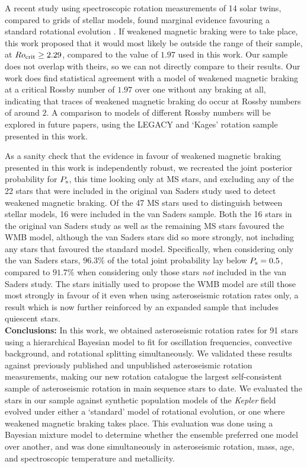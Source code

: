 \documentclass[12pt]{article}
\begin{document}
A recent study using spectroscopic rotation measurements of 14 solar twins, compared to grids of stellar models, found marginal evidence favouring a standard rotational evolution \cite{lorenzo-oliveira+2019}. If weakened magnetic braking were to take place, this work proposed that it would most likely be outside the range of their sample, at $Ro_{\rm {crit}} \geq 2.29$, compared to the value of $1.97$ used in this work. Our sample does not overlap with theirs, so we can not directly compare to their results. Our work does find statistical agreement with a model of weakened magnetic braking at a critical Rossby number of $1.97$ over one without any braking at all, indicating that traces of weakened magnetic braking do occur at Rossby numbers of around $2$. A comparison to models of different Rossby numbers will be explored in future papers, using the LEGACY and `Kages' rotation sample presented in this work.

As a sanity check that the evidence in favour of weakened magnetic braking presented in this work is independently robust, we recreated the joint posterior probability for $P_{\rm s}$, this time looking only at MS stars, and excluding any of the 22 stars that were included in the original van Saders study used to detect weakened magnetic braking. Of the 47 MS stars used to distinguish between stellar models, 16 were included in the van Saders sample. Both the 16 stars in the original van Saders study as well as the remaining MS stars favoured the WMB model, although the van Saders stars did so more strongly, not including any stars that favoured the standard model. Specifically, when considering only the van Saders stars, $96.3\%$ of the total joint probability lay below $P_{\rm s} = 0.5$, compared to $91.7\%$ when considering only those stars \emph{not} included in the van Saders study. The stars initially used to propose the WMB model are still those most strongly in favour of it even when using asteroseismic rotation rates only, a result which is now further reinforced by an expanded sample that includes quiescent stars.\\


\textbf{Conclusions:} In this work, we obtained asteroseismic rotation rates for 91 stars using a hierarchical Bayesian model to fit for oscillation frequencies, convective background, and rotational splitting simultaneously. We validated these results against previously published and unpublished asteroseismic rotation measurements, making our new rotation catalogue the largest self-consistent sample of asteroseismic rotation in main sequence stars to date. We evaluated the stars in our sample against synthetic population models of the \textit{Kepler} field evolved under either a `standard' model of rotational evolution, or one where weakened magnetic braking takes place. This evaluation was done using a Bayesian mixture model to determine whether the ensemble preferred one model over another, and was done simultaneously in asteroseismic rotation, mass, age, and spectroscopic temperature and metallicity.\\
\end{document}
